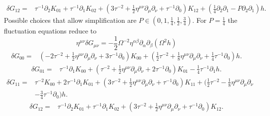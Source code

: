 \documentclass[10pt,letterpaper]{article}
\begin{document}
\begin{align}
\delta G_{12}={}&\tau^{-1} \partial_{2} K_{01}
 + \tau^{-1} \partial_{1} K_{02}
 + (3 \tau^{-2}
 + \tfrac{1}{2} \eta^{\mu \nu} \partial_{\mu} \partial_{\nu}
 + \tau^{-1} \partial_{0}) K_{12}
 + (\tfrac{1}{4} \partial_{2} \partial_{1}
 -  P \partial_{2} \partial_{1}) h.
\end{align}
Possible choices that allow simplification are $P\in (0,1,\tfrac14, \tfrac12,\tfrac34)$. For $P=\tfrac14$ the fluctuation equations reduce to
\begin{equation}
\eta^{\mu\nu}\delta G_{\mu\nu} =-\frac12 \Omega^{-2}\eta^{\alpha\beta}\partial_\alpha\partial_\beta (\Omega^{2} h)
\end{equation}
\begin{align}
\delta G_{00}={}&(-2 \tau^{-2}
 + \tfrac{1}{2} \eta^{\mu \nu} \partial_{\mu} \partial_{\nu}
 + 3 \tau^{-1} \partial_{0}) K_{00}
 + (\tfrac{1}{2} \tau^{-2}
 + \tfrac{1}{8} \eta^{\mu \nu} \partial_{\mu} \partial_{\nu}
 + \tfrac{1}{4} \tau^{-1} \partial_{0}) h.
\end{align}
\begin{align}
\delta G_{01}={}&\tau^{-1} \partial_{1} K_{00}
 + (\tau^{-2}
 + \tfrac{1}{2} \eta^{\mu \nu} \partial_{\mu} \partial_{\nu}
 + 2 \tau^{-1} \partial_{0}) K_{01}
 -  \tfrac{1}{4} \tau^{-1} \partial_{1} h.
\end{align}
\begin{align}
\delta G_{11}={}&\tau^{-2} K_{00}
 + 2 \tau^{-1} \partial_{1} K_{01}
 + (3 \tau^{-2}
 + \tfrac{1}{2} \eta^{\mu \nu} \partial_{\mu} \partial_{\nu}
 + \tau^{-1} \partial_{0}) K_{11}
 + (\tfrac{1}{2} \tau^{-2}
 -  \tfrac{1}{8} \eta^{\mu \nu} \partial_{\mu} \partial_{\nu}\nonumber\\
& -  \tfrac{3}{4} \tau^{-1} \partial_{0}) h.
\end{align}
\begin{align}
\delta G_{12}={}&\tau^{-1} \partial_{2} K_{01}
 + \tau^{-1} \partial_{1} K_{02}
 + (3 \tau^{-2}
 + \tfrac{1}{2} \eta^{\mu \nu} \partial_{\mu} \partial_{\nu}
 + \tau^{-1} \partial_{0}) K_{12}.
\end{align}
\\
\end{document}
